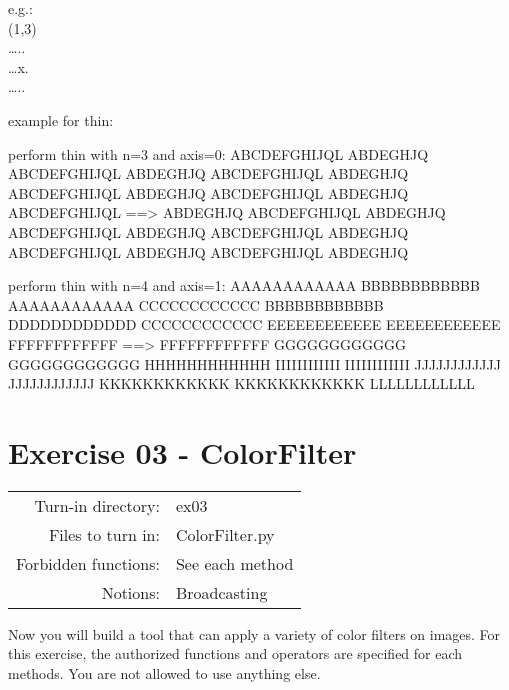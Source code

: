 \documentclass[]{article}
\newenvironment{Shaded}{\begin{snugshade}}{\end{snugshade}}
\newcommand{\NormalTok}[1]{\textcolor[rgb]{0.81,0.81,0.76}{#1}}
\begin{document}
e.g.:\\
(1,3)\\
\ldots{}..\\
\ldots{}x.\\
\ldots{}..

example for thin:

\begin{Shaded}
\begin{Highlighting}[]
\NormalTok{perform thin with n=3 and axis=0:}
\NormalTok{ABCDEFGHIJQL        ABDEGHJQ}
\NormalTok{ABCDEFGHIJQL        ABDEGHJQ}
\NormalTok{ABCDEFGHIJQL        ABDEGHJQ}
\NormalTok{ABCDEFGHIJQL        ABDEGHJQ}
\NormalTok{ABCDEFGHIJQL        ABDEGHJQ}
\NormalTok{ABCDEFGHIJQL  ==>   ABDEGHJQ}
\NormalTok{ABCDEFGHIJQL        ABDEGHJQ}
\NormalTok{ABCDEFGHIJQL        ABDEGHJQ}
\NormalTok{ABCDEFGHIJQL        ABDEGHJQ}
\NormalTok{ABCDEFGHIJQL        ABDEGHJQ}
\NormalTok{ABCDEFGHIJQL        ABDEGHJQ}

\NormalTok{perform thin with n=4 and axis=1:}
\NormalTok{AAAAAAAAAAAA        }
\NormalTok{BBBBBBBBBBBB        AAAAAAAAAAAA}
\NormalTok{CCCCCCCCCCCC        BBBBBBBBBBBB}
\NormalTok{DDDDDDDDDDDD        CCCCCCCCCCCC}
\NormalTok{EEEEEEEEEEEE        EEEEEEEEEEEE}
\NormalTok{FFFFFFFFFFFF  ==>   FFFFFFFFFFFF}
\NormalTok{GGGGGGGGGGGG        GGGGGGGGGGGG}
\NormalTok{HHHHHHHHHHHH        IIIIIIIIIIII}
\NormalTok{IIIIIIIIIIII        JJJJJJJJJJJJ}
\NormalTok{JJJJJJJJJJJJ        KKKKKKKKKKKK}
\NormalTok{KKKKKKKKKKKK        }
\NormalTok{LLLLLLLLLLLL        }
\end{Highlighting}
\end{Shaded}

\clearpage

\hypertarget{exercise-03---colorfilter-1}{%
\section{Exercise 03 - ColorFilter}\label{exercise-03---colorfilter-1}}

\begin{longtable}[]{@{}rl@{}}
\toprule
\endhead
Turn-in directory: & ex03\tabularnewline
Files to turn in: & ColorFilter.py\tabularnewline
Forbidden functions: & See each method\tabularnewline
Notions: & Broadcasting\tabularnewline
\bottomrule
\end{longtable}

Now you will build a tool that can apply a variety of color filters on
images. For this exercise, the authorized functions and operators are
specified for each methods. You are not allowed to use anything else.
\end{document}

